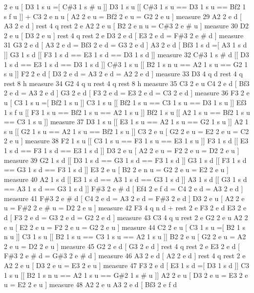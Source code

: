 2 e u \mbox{[} D3 1 s u =\mbox{[} C\#3 1 s \# u \mbox{]}\mbox{]} D3 1 s u \mbox{[}\mbox{[} C\#3 1 s u == D3 1 s u == Bf2 1 s f u \mbox{]}\mbox{]} + C3 2 e n u \mbox{[} A2 2 e u = Bf2 2 e u = G2 2 e u \mbox{]} measure 29 A2 2 e d \mbox{[} A3 2 e d \mbox{]} rest 4 q rest 2 e A2 2 e u \mbox{[} B2 2 e n u = C\#3 2 e \# u \mbox{]} measure 30 D2 2 e u \mbox{[} D3 2 e u \mbox{]} rest 4 q rest 2 e D3 2 e d \mbox{[} E3 2 e d = F\#3 2 e \# d \mbox{]} measure 31 G3 2 e d \mbox{[} A3 2 e d = Bf3 2 e d = G3 2 e d \mbox{]} A3 2 e d \mbox{[} Bf3 1 s d =\mbox{[} A3 1 s d \mbox{]}\mbox{]} G3 1 s d \mbox{[}\mbox{[} F3 1 s d == E3 1 s d == D3 1 s d \mbox{]}\mbox{]} measure 32 C\#3 1 s \# d \mbox{[}\mbox{[} D3 1 s d == E3 1 s d == D3 1 s d \mbox{]}\mbox{]} C\#3 1 s u \mbox{[}\mbox{[} B2 1 s n u == A2 1 s u == G2 1 s u \mbox{]}\mbox{]} F2 2 e d \mbox{[} D3 2 e d = A3 2 e d = A2 2 e d \mbox{]} measure 33 D3 4 q d rest 4 q rest 8 h measure 34 G2 4 q u rest 4 q rest 8 h measure 35 C3 2 e u C4 2 e d \mbox{[} Bf3 2 e d = A3 2 e d \mbox{]} G3 2 e d \mbox{[} F3 2 e d = E3 2 e d = C3 2 e d \mbox{]} measure 36 F3 2 e u \mbox{[} C3 1 s u =\mbox{[} Bf2 1 s u \mbox{]}\mbox{]} C3 1 s u \mbox{[}\mbox{[} Bf2 1 s u == C3 1 s u == D3 1 s u \mbox{]}\mbox{]} Ef3 1 s f u \mbox{[}\mbox{[} F3 1 s u == Bf2 1 s u == A2 1 s u \mbox{]}\mbox{]} Bf2 1 s u \mbox{[}\mbox{[} A2 1 s u == Bf2 1 s u == C3 1 s u \mbox{]}\mbox{]} measure 37 D3 1 s u \mbox{[}\mbox{[} E3 1 s u == A2 1 s u == G2 1 s u \mbox{]}\mbox{]} A2 1 s u \mbox{[}\mbox{[} G2 1 s u == A2 1 s u == Bf2 1 s u \mbox{]}\mbox{]} C3 2 e u \mbox{[} G2 2 e u = E2 2 e u = C2 2 e u \mbox{]} measure 38 F2 1 s u \mbox{[}\mbox{[} C3 1 s u == F3 1 s u == E3 1 s u \mbox{]}\mbox{]} F3 1 s d \mbox{[}\mbox{[} E3 1 s d == F3 1 s d == E3 1 s d \mbox{]}\mbox{]} D3 2 e u \mbox{[} A2 2 e u = F2 2 e u = D2 2 e u \mbox{]} measure 39 G2 1 s d \mbox{[}\mbox{[} D3 1 s d == G3 1 s d == F3 1 s d \mbox{]}\mbox{]} G3 1 s d \mbox{[}\mbox{[} F3 1 s d == G3 1 s d == F3 1 s d \mbox{]}\mbox{]} E3 2 e u \mbox{[} B2 2 e n u = G2 2 e u = E2 2 e u \mbox{]} measure 40 A2 1 s d \mbox{[}\mbox{[} E3 1 s d == A3 1 s d == G3 1 s d \mbox{]}\mbox{]} A3 1 s d \mbox{[}\mbox{[} G3 1 s d == A3 1 s d == G3 1 s d \mbox{]}\mbox{]} F\#3 2 e \# d \mbox{[} Ef4 2 e f d = C4 2 e d = A3 2 e d \mbox{]} measure 41 F\#3 2 e \# d \mbox{[} C4 2 e d = A3 2 e d = F\#3 2 e d \mbox{]} D3 2 e u \mbox{[} A2 2 e u = F\#2 2 e \# u = D2 2 e u \mbox{]} measure 42 F3 4 q n d + rest 2 e F3 2 e d E3 2 e d \mbox{[} F3 2 e d = G3 2 e d = G2 2 e d \mbox{]} measure 43 C3 4 q u rest 2 e G2 2 e u A2 2 e u \mbox{[} E2 2 e u = F2 2 e u = G2 2 e u \mbox{]} measure 44 C2 2 e u \mbox{[} C3 1 s u =\mbox{[} B2 1 s n u \mbox{]}\mbox{]} C3 1 s u \mbox{[}\mbox{[} B2 1 s u == C3 1 s u == A2 1 s u \mbox{]}\mbox{]} B2 2 e u \mbox{[} G2 2 e u = A2 2 e u = D2 2 e u \mbox{]} measure 45 G2 2 e d \mbox{[} G3 2 e d \mbox{]} rest 4 q rest 2 e E3 2 e d \mbox{[} F\#3 2 e \# d = G\#3 2 e \# d \mbox{]} measure 46 A3 2 e d \mbox{[} A2 2 e d \mbox{]} rest 4 q rest 2 e A2 2 e u \mbox{[} D3 2 e u = E3 2 e u \mbox{]} measure 47 F3 2 e d \mbox{[} E3 1 s d =\mbox{[} D3 1 s d \mbox{]}\mbox{]} C3 1 s u \mbox{[}\mbox{[} B2 1 s n u == A2 1 s u == G\#2 1 s \# u \mbox{]}\mbox{]} A2 2 e u \mbox{[} D3 2 e u = E3 2 e u = E2 2 e u \mbox{]} measure 48 A2 2 e u A3 2 e d \mbox{[} Bf3 2 e f d 